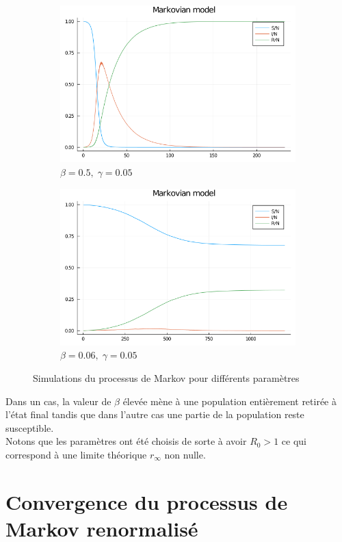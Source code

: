 \documentclass[12pt]{extarticle}
\begin{document}
\begin{figure}[h!]
    \begin{subfigure}{.5\textwidth}
        \includegraphics[width=0.8\linewidth]{figures/markovian_all_retired.png}
        \caption{$\beta = 0.5, \; \gamma = 0.05$}
    \end{subfigure}
    \begin{subfigure}{.5\textwidth}
        \includegraphics[width=0.8\linewidth]{figures/markovian_stable.png}
        \caption{$\beta = 0.06, \; \gamma = 0.05$}
    \end{subfigure}
    \caption{Simulations du processus de Markov pour différents paramètres}
    \label{fig:final states}
\end{figure}

Dans un cas, la valeur de $\beta$ élevée mène à une population entièrement retirée à l'état final tandis que dans l'autre cas une partie de la population reste susceptible.\\
Notons que les paramètres ont été choisis de sorte à avoir $R_0 > 1$ ce qui correspond à une limite théorique $r_\infty$ non nulle.

\section{Convergence du processus de Markov renormalisé}
\end{document}
